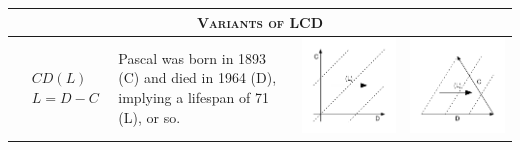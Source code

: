 \documentclass[12pt,oneside,letter]{article} %
\begin{document}
\begin{center}
\begin{longtable}{m{}m{}m{}m{}}
  \midrule
  \midrule
  \multicolumn{4}{c}{\textsc{Variants of LCD}}
  \\
  \midrule
  $$\begin{aligned}
    &CD(L) \\
    &L = D - C
  \end{aligned}$$ &
  Pascal was born in 1893 (C) and died in 1964 (D), implying a lifespan of 71
  (L), or so.
  & \includegraphics[width = \linewidth]{Figures/JonasTable/CDl.pdf} &
  \includegraphics[width = \linewidth]{Figures/JonasTable/CDl_iso.pdf}  \\

\end{longtable}
\end{center}
\end{document}
